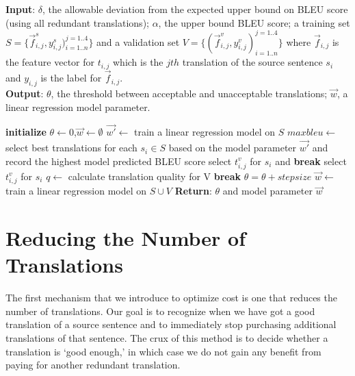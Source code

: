 \documentclass[11pt,letterpaper]{article}
\begin{document}
\begin{algorithm}[h!]
\caption{}\label{modelselection}
\textbf{Input}: $\delta$, the allowable deviation from the expected upper bound on BLEU score (using all redundant translations); $\alpha$, the upper bound BLEU score; a training set $S = \{\vec f^{s}_{i,j},y^{s}_{i,j})_{i=1..n}^{j=1..4}\}$ and a validation set $V = \{(\vec f^{v}_{i,j},y^{v}_{i,j})_{i=1..n}^{j=1..4}\}$ where $\vec f_{i,j}$ is the feature vector for $t_{i,j}$ which is the $jth$ translation of the source sentence $s_{i}$ and $y_{i,j}$ is the label for $\vec f_{i,j}$.\\
\textbf{Output}: $\theta$, the threshold between acceptable and unacceptable translations; $\vec{w}$, a linear regression model parameter. 
\begin{algorithmic}[1]
\State \textbf{initialize} $\theta \leftarrow 0$,$\vec{w}\leftarrow \emptyset$ 
\State $\vec{w'}\leftarrow$ train a linear regression model on $S$
\State $maxbleu \leftarrow$ select best translations for each $s_i \in S$ based on the model parameter $\vec{w'}$ and record the highest model predicted BLEU score
             select $t^{v}_{i,j}$ for $s_i$ and \textbf{break}
\EndIf
{} select $t^{v}_{i,j}$ for $s_i$
\EndIf
\EndFor
\EndFor
\State $q \leftarrow$ calculate translation quality for V
 \textbf{break}
\Else \text{  } $\theta = \theta + stepsize$
\EndIf
\EndWhile
\State $\vec {w} \leftarrow$ train a linear regression model on $S \cup V$
\State \textbf{Return}: $\theta$ and model parameter $\vec{w}$
\end{algorithmic}
\end{algorithm}



\section{Reducing the Number of Translations}
The first mechanism that we introduce to optimize cost is one that reduces the number of translations.  Our goal is to recognize when we have got a good translation of a source sentence and to immediately stop purchasing additional  translations of that sentence.  The crux of this method is to decide whether a translation  is `good enough,' in which case we do not gain any benefit from  paying for another redundant translation.  
\end{document}
